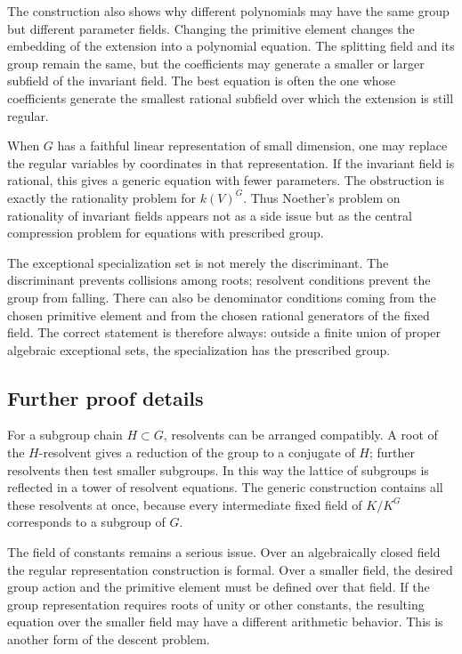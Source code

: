 \documentclass[11pt]{article}
\begin{document}
The construction also shows why different polynomials may have the same group but different
parameter fields. Changing the primitive element changes the embedding of the extension into a
polynomial equation. The splitting field and its group remain the same, but the coefficients may
generate a smaller or larger subfield of the invariant field. The best equation is often the one
whose coefficients generate the smallest rational subfield over which the extension is still
regular.

When \(G\) has a faithful linear representation of small dimension, one may replace the regular
variables by coordinates in that representation. If the invariant field is rational, this gives a
generic equation with fewer parameters. The obstruction is exactly the rationality problem for
\(k(V)^G\). Thus Noether's problem on rationality of invariant fields appears not as a side issue
but as the central compression problem for equations with prescribed group.

The exceptional specialization set is not merely the discriminant. The discriminant prevents
collisions among roots; resolvent conditions prevent the group from falling. There can also be
denominator conditions coming from the chosen primitive element and from the chosen rational
generators of the fixed field. The correct statement is therefore always: outside a finite union of
proper algebraic exceptional sets, the specialization has the prescribed group.


\subsection{Further proof details}

For a subgroup chain \(H\subset G\), resolvents can be arranged compatibly. A root of the
\(H\)-resolvent gives a reduction of the group to a conjugate of \(H\); further resolvents then test
smaller subgroups. In this way the lattice of subgroups is reflected in a tower of resolvent
equations. The generic construction contains all these resolvents at once, because every
intermediate fixed field of \(K/K^G\) corresponds to a subgroup of \(G\).

The field of constants remains a serious issue. Over an algebraically closed field the regular
representation construction is formal. Over a smaller field, the desired group action and the
primitive element must be defined over that field. If the group representation requires roots of
unity or other constants, the resulting equation over the smaller field may have a different
arithmetic behavior. This is another form of the descent problem.
\end{document}
